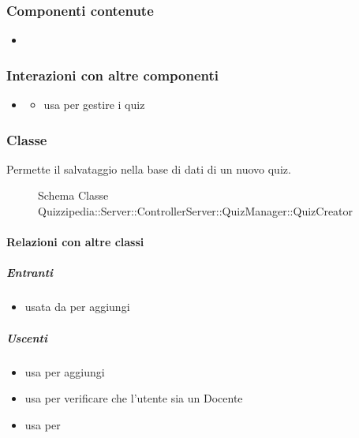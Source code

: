 \subsubsection{Componenti contenute}
\begin{itemize}
\item {}
\end{itemize}
\subsubsection{Interazioni con altre componenti}
\begin{itemize}
\item {}
\begin{itemize}
\item usa  per gestire i quiz
\end{itemize}
\end{itemize}
\subsubsection{Classe }
Permette il salvataggio nella base di dati di un nuovo quiz.
\begin{figure}[H]
\centering
\noindent{}
\caption[Schema Classe QuizCreator]{Schema Classe Quizzipedia::Server::ControllerServer::QuizManager::QuizCreator}
\end{figure}
\paragraph{Relazioni con altre classi}
\subparagraph{Entranti}
\begin{itemize}
\item usata da  per aggiungi
\end{itemize}
\subparagraph{Uscenti}
\begin{itemize}
\item usa  per aggiungi
\item usa  per verificare che l'utente sia un Docente
\item usa  per 
\end{itemize}
